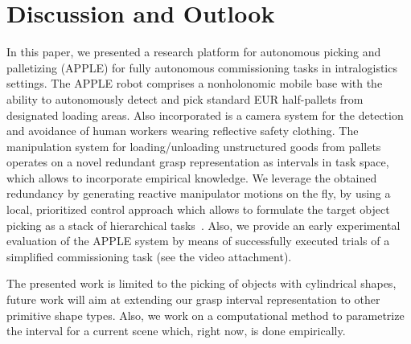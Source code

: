 \section{Discussion and Outlook}
\label{sec:discussion}
%
In this paper, we presented a research platform for autonomous picking and palletizing (APPLE) for
fully autonomous commissioning tasks in intralogistics settings. The APPLE robot comprises a
nonholonomic mobile base with the ability to autonomously detect and pick standard EUR half-pallets
from designated loading areas. Also incorporated is a camera system for the detection and avoidance
of human workers wearing reflective safety clothing. The manipulation system for loading/unloading
unstructured goods from pallets operates on a novel redundant grasp representation as intervals in
task space, which allows to incorporate empirical knowledge. We leverage the obtained redundancy by
generating reactive manipulator motions on the fly, by using a local, prioritized control approach
which allows to formulate the target object picking as a stack of hierarchical
tasks~\cite{Kano11}. Also, we provide an early experimental evaluation of the APPLE system by means
of successfully executed trials of a simplified commissioning task (see the video attachment).

The presented work is limited to the picking of objects with cylindrical shapes, future work will
aim at extending our grasp interval representation to other primitive shape types. Also, we work on
a computational method to parametrize the interval for a current scene which, right now, is done
empirically. 


